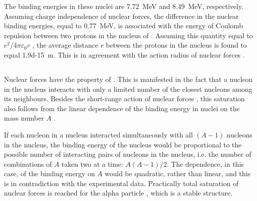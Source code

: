 The binding energies  in these nuclei are \SI{7.72}{\mega\electronvolt} and \SI{8.49}{\mega\electronvolt}, respectively. Assuming charge independence of nuclear forces, the difference in the nuclear binding energies, equal to \SI{0.77}{\mega\electronvolt}, is associated with the energy of Coulomb repulsion between two protons in the nucleus of . Assuming this quantity equal to $e^{2}/4\pi \varepsilon_{0}r$ , the average distance $r$ between
the protons in the  nucleus is found to equal \SI{1.9d-15}{\meter}. This is in agreement with the action radius of nuclear forces .

\subsection{}\label{42.3.4}

Nuclear forces have the property of . This
is manifested in the fact that a nucleon in the nucleus interacts with only a limited number of the closest nucleons among its neighbours. Besides the short-range action of nuclear forces , this saturation also follows from the linear dependence of the binding energy in nuclei on the mass number $A$ .

If each nucleon in a nucleus interacted simultaneously with
all $(A - 1)$ nucleons in the nucleus, the binding energy of the nucleus would be proportional to the possible number of interacting pairs of nucleons in the nucleus, i.e. the number of combinations of $A$ taken two at a time: $A (A - 1)/2$. The dependence, in this case, of the binding energy on $A$ would be quadratic, rather than linear, and this is in contradiction with the experimental data. Practically total saturation of nuclear forces is reached for the alpha particle , which is a stable
structure.

